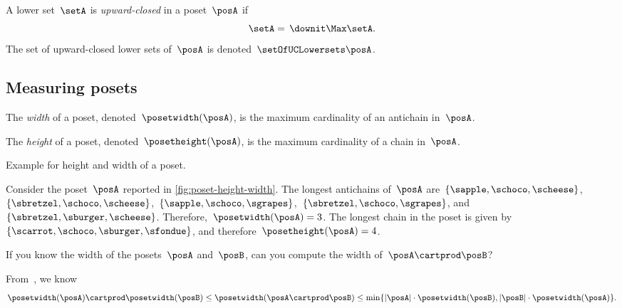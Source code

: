 \begin{definition}
	\label{def:upward-closed-lowerset}
	A lower set~$\setA$ is \emph{upward-closed} in a poset~$\posA$ if
	\begin{equation}
		\setA =\, \downit  \Max \setA.
	\end{equation}
	The set of upward-closed lower sets of~$\posA$ is denoted~$\setOfUCLowersets \posA$.

\end{definition}

\subsection{Measuring posets}
\begin{definition}
	\label{def:poset-width}
	The \emph{width} of a poset, denoted~$\posetwidth(\posA)$, is the maximum cardinality of an antichain in~$\posA$.
\end{definition}

\begin{definition}
	\label{def:poset-height}
	The \emph{height} of a poset, denoted~$\posetheight(\posA)$, is the maximum cardinality of a chain in~$\posA$.
\end{definition}

\begin{marginfigure}
	\centering
	\caption{Example for height and width of a poset.}
	\label{fig:poset-height-width}
\end{marginfigure}

\begin{example}
	Consider the poset~$\posA$ reported in \cref{fig:poset-height-width}.
	The longest antichains of~$\posA$ are~$\{\sapple, \schoco, \scheese\}$,~$\{\sbretzel, \schoco, \scheese\}$,~$\{\sapple, \schoco, \sgrapes\}$,~$\{\sbretzel, \schoco, \sgrapes\}$, and~$\{\sbretzel, \sburger, \scheese\}$.
	Therefore,~$\posetwidth(\posA)=3$.
	The longest chain in the poset is given by~$\{\scarrot,\schoco,\sburger,\sfondue\}$, and therefore~$\posetheight(\posA)=4$.
\end{example}

\begin{exercise}
	\label{ex:width}
	If you know the width of the posets~$\posA$ and~$\posB$, can you compute the width of~$\posA\cartprod\posB$?
\end{exercise}
\begin{solution}
	From~\cite{bezrukovantichains}, we know
	\begin{equation*}
		\posetwidth(\posA)\cartprod \posetwidth(\posB)\leq \posetwidth(\posA\cartprod \posB)\leq \min \{ \vert \posA\vert \cdot \posetwidth(\posB),\vert \posB \vert \cdot \posetwidth(\posA)\}.
	\end{equation*}
\end{solution}

